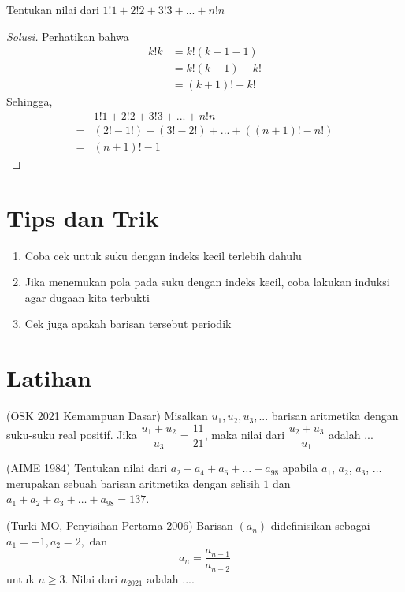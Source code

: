 \documentclass[11pt]{scrartcl}
\begin{document}
\begin{example}
    Tentukan nilai dari $1!1 + 2!2 + 3!3 + ... + n!n$
\end{example}

\begin{proof}[Solusi]
    Perhatikan bahwa 
    \begin{align*}
        k!k &= k!(k + 1 - 1)\\
        &= k!(k + 1) - k!\\
        &= (k + 1)! - k!
    \end{align*}
    Sehingga, 
    \begin{align*}
        &1!1 + 2!2 + 3!3 + ... + n!n \\
        = &(2! - 1!) + (3! - 2!) + ... + ((n + 1)! - n!) \\
        = &(n + 1)! - 1
    \end{align*}
\end{proof}


\section{Tips dan Trik}
\begin{enumerate}
    \item Coba cek untuk suku dengan indeks kecil terlebih dahulu
    \item Jika menemukan pola pada suku dengan indeks kecil, coba lakukan induksi agar dugaan kita terbukti
    \item Cek juga apakah barisan tersebut periodik
\end{enumerate}


\section{Latihan}
\begin{problem}
    (OSK 2021 Kemampuan Dasar) Misalkan $u_1, u_2, u_3, ...$ barisan aritmetika dengan suku-suku real positif. Jika $\dfrac{u_1 + u_2}{u_3} = \dfrac{11}{21}$, maka nilai dari $\dfrac{u_2 + u_3}{u_1}$ adalah ...
\end{problem}

\begin{problem}
    (AIME 1984) Tentukan nilai dari $a_2 + a_4 + a_6 + \dots + a_{98}$ apabila $a_1$, $a_2$, $a_3$, $\dots$ merupakan sebuah barisan aritmetika dengan selisih $1$ dan $a_1 + a_2 + a_3 + \dots + a_{98} = 137$.
\end{problem}

\begin{problem}
    (Turki MO, Penyisihan Pertama 2006) Barisan $(a_n)$ didefinisikan sebagai $a_1 = -1, a_2 = 2,$ dan \[a_n = \frac{a_{n-1}}{a_{n-2}}\] untuk $n\geq 3$. Nilai dari $a_{2021}$ adalah ....
\end{problem}
\end{document}
